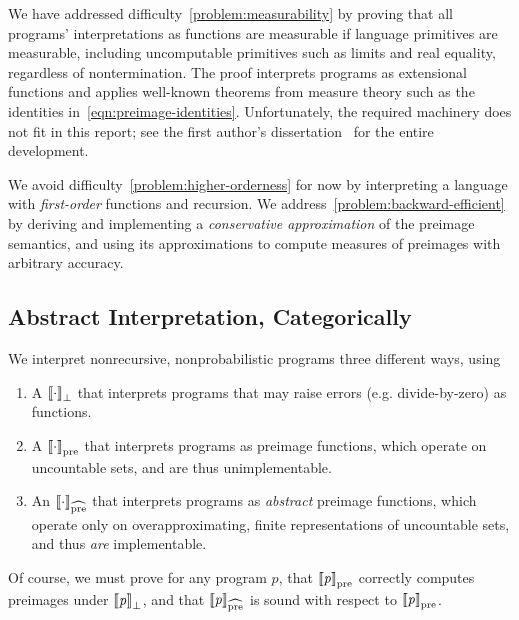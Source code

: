 \documentclass{llncs}
\newcommand{\todo}[1]{}
\newcommand{\pre}{_\mathrm{pre}}
\newcommand{\prehat}{_\mathrm{\widehat{pre}}}
\begin{document}
We have addressed difficulty~\ref{problem:measurability} by proving that all programs' interpretations as functions are measurable if language primitives are measurable, including uncomputable primitives such as limits and real equality, regardless of nontermination.
The proof interprets programs as extensional functions and applies well-known theorems from measure theory such as the identities in~\eqref{eqn:preimage-identities}.
Unfortunately, the required machinery does not fit in this report; see the first author's dissertation~\cite{cit:toronto-thesis} for the entire development.

We avoid difficulty~\ref{problem:higher-orderness} for now by interpreting a language with \emph{first-order} functions and recursion.
We address~\ref{problem:backward-efficient} by deriving and implementing a \emph{conservative approximation} of the preimage semantics, and using its approximations to compute measures of preimages with arbitrary accuracy.

\subsection{Abstract Interpretation, Categorically}

\todo{David: Need a transition from previous subsection.}

\todo{David: Need some forward-looking intuition about why you need the following.}

We interpret nonrecursive, nonprobabilistic programs three different ways, using
\begin{enumerate}
	\item A  $\left\llbracket{\cdot}\right\rrbracket_\bot$ that interprets programs that may raise errors (e.g. divide-by-zero) as functions.
	\item A  $\meaningof{\cdot}\pre$ that interprets programs as preimage functions, which operate on uncountable sets, and are thus unimplementable.
	\item An  $\meaningof{\cdot}\prehat$ that interprets programs as \emph{abstract} preimage functions, which operate only on overapproximating, finite representations of uncountable sets, and thus \emph{are} implementable.
\end{enumerate}
Of course, we must prove for any program $\mathit{p}$, that $\meaningof{\mathit{p}}\pre$ correctly computes preimages under $\left\llbracket{\mathit{p}}\right\rrbracket_\bot$, and that $\meaningof{\mathit{p}}\prehat$ is sound with respect to $\meaningof{\mathit{p}}\pre$.
\end{document}
